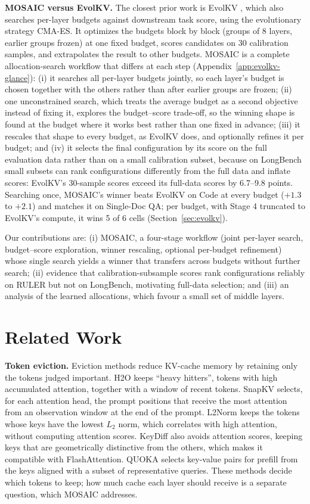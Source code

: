 \documentclass[11pt]{article}
\begin{document}
\textbf{MOSAIC versus EvolKV.}\label{sec:intro-evolkv} The closest prior work is EvolKV \citep{yu2025evolkv}, which also searches per-layer budgets against downstream task score, using the evolutionary strategy CMA-ES. It optimizes the budgets block by block (groups of 8 layers, earlier groups frozen) at one fixed budget, scores candidates on 30 calibration samples, and extrapolates the result to other budgets. MOSAIC is a complete allocation-search workflow that differs at each step (Appendix~\ref{app:evolkv-glance}): (i) it searches all per-layer budgets jointly, so each layer's budget is chosen together with the others rather than after earlier groups are frozen; (ii) one unconstrained search, which treats the average budget as a second objective instead of fixing it, explores the budget--score trade-off, so the winning shape is found at the budget where it works best rather than one fixed in advance; (iii) it rescales that shape to every budget, as EvolKV does, and optionally refines it per budget; and (iv) it selects the final configuration by its score on the full evaluation data rather than on a small calibration subset, because on LongBench small subsets can rank configurations differently from the full data and inflate scores: EvolKV's 30-sample scores exceed its full-data scores by 6.7--9.8 points. Searching once, MOSAIC's winner beats EvolKV on Code at every budget ($+1.3$ to $+2.1$) and matches it on Single-Doc QA; per budget, with Stage 4 truncated to EvolKV's compute, it wins 5 of 6 cells (Section~\ref{sec:evolkv}).

Our contributions are: (i) MOSAIC, a four-stage workflow (joint per-layer search, budget--score exploration, winner rescaling, optional per-budget refinement) whose single search yields a winner that transfers across budgets without further search; (ii) evidence that calibration-subsample scores rank configurations reliably on RULER but not on LongBench, motivating full-data selection; and (iii) an analysis of the learned allocations, which favour a small set of middle layers.

\section{Related Work}

\textbf{Token eviction.} Eviction methods reduce KV-cache memory by retaining only the tokens judged important. H2O \citep{zhang2023h2o} keeps ``heavy hitters'', tokens with high accumulated attention, together with a window of recent tokens. SnapKV \citep{li2024snapkv} selects, for each attention head, the prompt positions that receive the most attention from an observation window at the end of the prompt. L2Norm \citep{devoto2024l2norm} keeps the tokens whose keys have the lowest $L_2$ norm, which correlates with high attention, without computing attention scores. KeyDiff \citep{park2025keydiff} also avoids attention scores, keeping keys that are geometrically distinctive from the others, which makes it compatible with FlashAttention. QUOKA \citep{jones2026quoka} selects key-value pairs for prefill from the keys aligned with a subset of representative queries. These methods decide which tokens to keep; how much cache each layer should receive is a separate question, which MOSAIC addresses.
\end{document}
